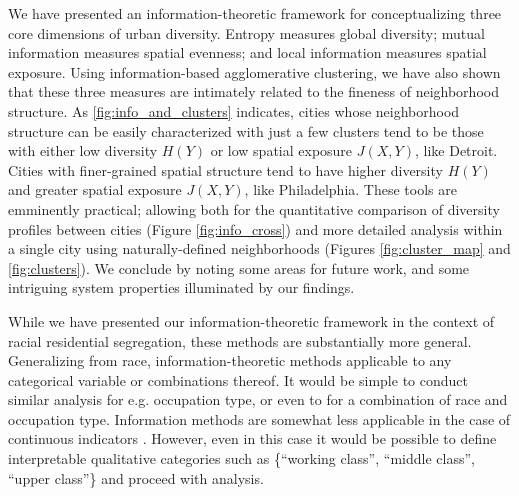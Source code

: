 We have presented an information-theoretic framework for conceptualizing three core dimensions of urban diversity. Entropy measures global diversity; mutual information measures spatial evenness; and local information measures spatial exposure. Using information-based agglomerative clustering, we have also shown that these three measures are intimately related to the fineness of neighborhood structure. As \ref{fig:info_and_clusters} indicates, cities whose neighborhood structure can be easily characterized with just a few clusters tend to be those with either low diversity $H(Y)$ or low spatial exposure $J(X,Y)$, like Detroit. Cities with finer-grained spatial structure tend to have higher diversity $H(Y)$ and greater spatial exposure $J(X,Y)$, like Philadelphia. These tools are emminently practical; allowing both for the quantitative comparison of diversity profiles between cities (Figure \ref{fig:info_cross}) and more detailed analysis within a single city using naturally-defined neighborhoods (Figures \ref{fig:cluster_map} and \ref{fig:clusters}). We conclude by noting some areas for future work, and some intriguing system properties illuminated by our findings. 

While we have presented our information-theoretic framework in the context of racial residential segregation, these methods are substantially more general. Generalizing from race, information-theoretic methods applicable to any categorical variable or combinations thereof. It would be simple to conduct similar analysis for e.g. occupation type, or even to for a combination of race and occupation type. Information methods are somewhat less applicable in the case of continuous indicators \cite{Cover1991}. However, even in this case it would be possible to define interpretable qualitative categories such as \{``working class'', ``middle class'', ``upper class''\} and proceed with analysis. 

